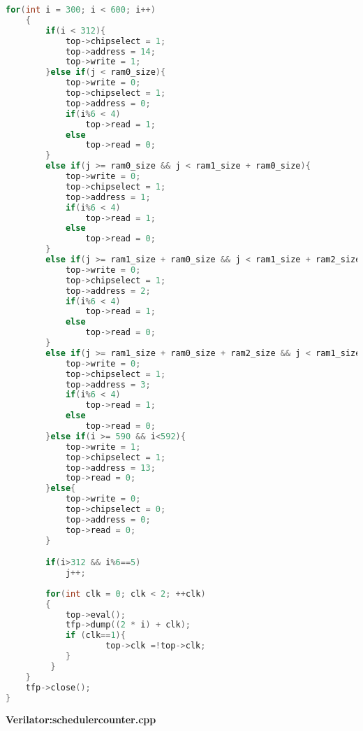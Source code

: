 \documentclass[twoside,12pt,fleqn]{book} %
\begin{document}
\begin{lstlisting}[language=C++]
    for(int i = 300; i < 600; i++)
    {   
        if(i < 312){
            top->chipselect = 1;
            top->address = 14;
            top->write = 1;
        }else if(j < ram0_size){
            top->write = 0;
            top->chipselect = 1;
            top->address = 0;
            if(i%6 < 4)
                top->read = 1;
            else
                top->read = 0;
        }
        else if(j >= ram0_size && j < ram1_size + ram0_size){
            top->write = 0;
            top->chipselect = 1;
            top->address = 1;
            if(i%6 < 4)
                top->read = 1;
            else
                top->read = 0;
        }
        else if(j >= ram1_size + ram0_size && j < ram1_size + ram2_size + ram0_size){
            top->write = 0;
            top->chipselect = 1;
            top->address = 2;
            if(i%6 < 4)
                top->read = 1;
            else
                top->read = 0;
        }
        else if(j >= ram1_size + ram0_size + ram2_size && j < ram1_size + ram2_size + ram3_size + ram0_size){
            top->write = 0;
            top->chipselect = 1;
            top->address = 3;
            if(i%6 < 4)
                top->read = 1;
            else
                top->read = 0;
        }else if(i >= 590 && i<592){
            top->write = 1;
            top->chipselect = 1;
            top->address = 13;
            top->read = 0;
        }else{
            top->write = 0;
            top->chipselect = 0;
            top->address = 0;
            top->read = 0;
        }

        if(i>312 && i%6==5)
            j++;
        
        for(int clk = 0; clk < 2; ++clk)
        {
            top->eval();
            tfp->dump((2 * i) + clk);
            if (clk==1){
                    top->clk =!top->clk;
            }
         }
    }
    tfp->close();
}

\end{lstlisting}
\newpage
\textbf{Verilator:schedulercounter.cpp}
\end{document}
